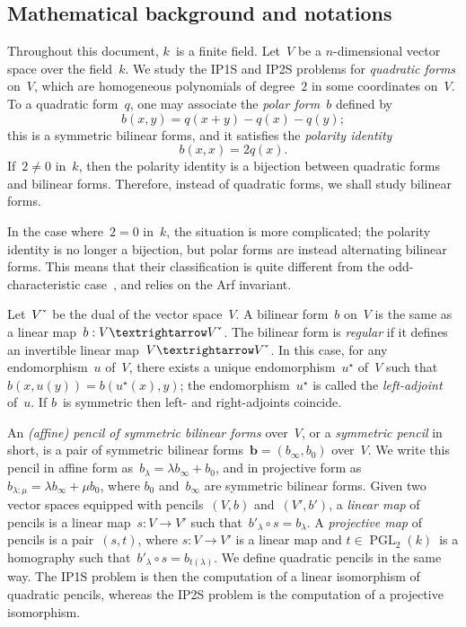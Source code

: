 \documentclass{article}%
\def\chk#1{#1^{\smash{\scalebox{.7}[1.4]{\rotatebox{90}{\guilsinglleft}}}}}
\DeclareMathOperator\PGL{PGL}
\begin{document}
\subsection*{Mathematical background and notations}%
Throughout this document, $k$~is a finite field.
Let~$V$ be a $n$-dimensional vector space over the field~$k$. We study
the IP1S and IP2S problems for \emph{quadratic forms} on~$V$, which are
homogeneous polynomials of degree~$2$ in some coordinates on~$V$. To a
quadratic form~$q$, one may associate the \emph{polar form}~$b$ defined
by
\begin{equation*}\label{eq:polar}
b(x,y) = q(x+y) - q(x) - q(y);
\end{equation*}
this is a symmetric bilinear forms, and it satisfies the \emph{polarity
identity}
\begin{equation*}\label{eq:polarity}
b(x,x) = 2q(x).
\end{equation*}
If~$2 ≠ 0$ in~$k$, then the polarity identity is a bijection between
quadratic forms and bilinear forms. Therefore, instead of quadratic
forms, we shall study bilinear forms.

In the case where~$2 = 0$ in~$k$, the situation is more complicated;
the polarity identity is no longer a bijection, but polar forms are
instead alternating bilinear forms. This means that their classification is
quite different from the odd-characteristic case~\cite{milnorhusemoller},
and relies on the Arf invariant.

Let~$\chk{V}$ be the dual of the vector space~$V$. A bilinear form~$b$
on~$V$ is the same as a linear map~$b: V → \chk{V}$. The bilinear form is
\emph{regular} if it defines an invertible linear map~$V → \chk{V}$. In
this case, for any endomorphism~$u$ of~$V$, there exists a unique
endomorphism~$u^{⋆}$ of~$V$ such that~$b(x,u(y)) = b(u^{⋆}(x), y)$; the
endomorphism~$u^{⋆}$ is called the \emph{left-adjoint} of~$u$. If $b$~is
symmetric then left- and right-adjoints coincide.

An \emph{(affine) pencil of symmetric bilinear forms} over~$V$, or a
\emph{symmetric pencil} in short, is a pair of symmetric bilinear
forms~$\bm{b} = (b_{∞}, b_{0})$ over~$V$. We write this pencil in affine
form as~$b_{λ} = λ b_{∞} + b_{0}$, and in projective form as~$b_{λ:μ} = λ
b_{∞} + μ b_{0}$, where $b_{0}$ and~$b_{∞}$ are symmetric bilinear forms.
Given two vector spaces equipped with pencils~$(V, b)$ and~$(V', b')$, a
\emph{linear map} of pencils is a linear map~$s: V → V'$ such
that~$b'_{λ} ∘ s = b_{λ}$. A \emph{projective map} of pencils is a
pair~$(s, t)$, where $s: V → V'$ is a linear map and $t ∈ \PGL_2 (k)$~is
a homography such that~$b'_{λ} ∘ s = b_{t(λ)}$. We define quadratic
pencils in the same way. The IP1S problem is then the computation of a
linear isomorphism of quadratic pencils, whereas the IP2S problem is the
computation of a projective isomorphism.
\end{document}

